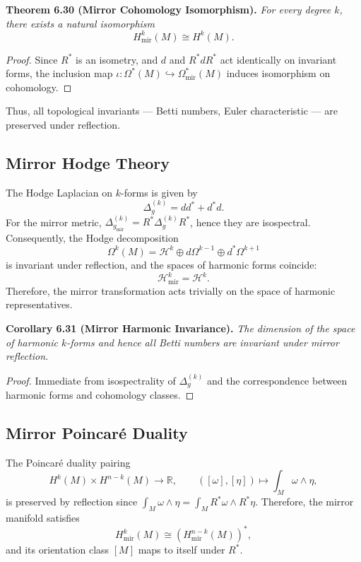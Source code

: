\noindent
\textbf{Theorem 6.30 (Mirror Cohomology Isomorphism).}
\emph{For every degree \(k\),
there exists a natural isomorphism}
\[
H_{\mathrm{mir}}^{k}(M)
\cong H^{k}(M).
\]

\begin{proof}
Since \(R^{*}\) is an isometry,
and \(d\) and \(R^{*}dR^{*}\) act identically on invariant forms,
the inclusion map
\(\iota:\Omega^{*}(M)\hookrightarrow\Omega^{*}_{\mathrm{mir}}(M)\)
induces isomorphism on cohomology.
\end{proof}

Thus, all topological invariants — Betti numbers, Euler characteristic —
are preserved under reflection.

\subsection{Mirror Hodge Theory}\relax \hspace{0pt}

The Hodge Laplacian on \(k\)-forms is given by
\[
\Delta_{g}^{(k)}=dd^{*}+d^{*}d.
\]
For the mirror metric,
\(\Delta_{g_{\mathrm{mir}}}^{(k)}=R^{*}\Delta_{g}^{(k)}R^{*}\),
hence they are isospectral.
Consequently, the Hodge decomposition
\[
\Omega^{k}(M)
=\mathcal{H}^{k}\oplus d\Omega^{k-1}\oplus d^{*}\Omega^{k+1}
\]
is invariant under reflection,
and the spaces of harmonic forms coincide:
\[
\mathcal{H}_{\mathrm{mir}}^{k}
=\mathcal{H}^{k}.
\]
Therefore, the mirror transformation acts trivially on the space of harmonic representatives.

\noindent
\textbf{Corollary 6.31 (Mirror Harmonic Invariance).}
\emph{The dimension of the space of harmonic \(k\)-forms
and hence all Betti numbers are invariant under mirror reflection.}

\begin{proof}
Immediate from isospectrality of \(\Delta_{g}^{(k)}\)
and the correspondence between harmonic forms and cohomology classes.
\end{proof}

\subsection{Mirror Poincaré Duality}\relax \hspace{0pt}

The Poincaré duality pairing
\[
H^{k}(M)\times H^{n-k}(M)\to\mathbb{R},
\qquad
([\omega],[\eta])\mapsto\int_{M}\omega\wedge\eta,
\]
is preserved by reflection since
\(\int_{M}\omega\wedge\eta
=\int_{M}R^{*}\omega\wedge R^{*}\eta.\)
Therefore, the mirror manifold satisfies
\[
H_{\mathrm{mir}}^{k}(M)
\cong (H_{\mathrm{mir}}^{n-k}(M))^{*},
\]
and its orientation class \([M]\) maps to itself under \(R^{*}\).

